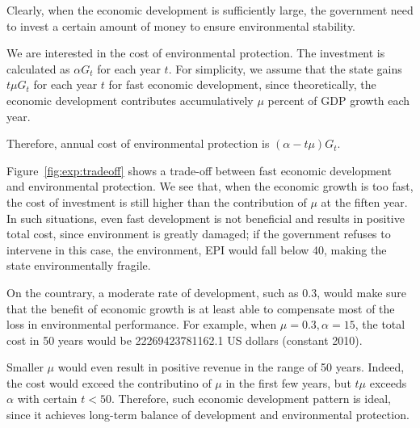 Clearly, when the economic development is sufficiently large, the government need to invest a certain amount of money to ensure environmental stability.

We are interested in the cost of environmental protection. The investment is calculated as $\alpha G_t$ for each year $t$. For simplicity, we assume that the state gains $t\mu G_t$ for each year $t$ for fast economic development, since theoretically, the economic development contributes accumulatively $\mu$ percent of GDP growth each year. 

Therefore, annual cost of environmental protection is $(\alpha-t\mu)G_t$.

Figure~\ref{fig:exp:tradeoff} shows a trade-off between fast economic development and environmental protection. 
We see that, when the economic growth is too fast, the cost of investment is still higher than the contribution of $\mu$ at the fiften year. In such situations, even fast development is not beneficial and results in positive total cost, since environment is greatly damaged; if the government refuses to intervene in this case, the environment, EPI would fall below 40, making the state environmentally fragile.

On the countrary, a moderate rate of development, such as 0.3, would make sure that the benefit of economic growth is at least able to compensate most of the loss in environmental performance. For example, when $\mu=0.3, \alpha=15$, the total cost in 50 years would be 22269423781162.1 US dollars (constant 2010). 

Smaller $\mu$ would even result in positive revenue in the range of 50 years. Indeed, the cost would exceed the contributino of $\mu$ in the first few years, but $t\mu$ exceeds $\alpha$ with certain $t<50$. Therefore, such economic development pattern is ideal, since it achieves long-term balance of development and environmental protection.